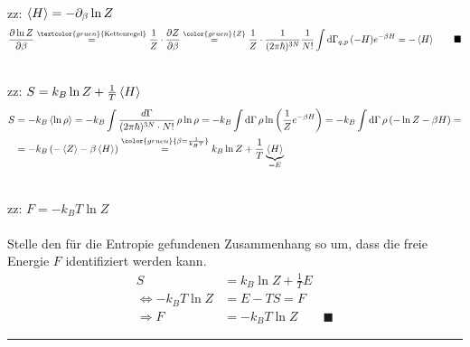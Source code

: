 \documentclass{article}
\newcommand{\diff}{\mathrm{d}}
\newcommand{\lr}[1]{\left(#1\right)}
\newcommand{\commenttext}[1]{\textcolor{gruen}{\text{#1}}}
\newcommand{\comment}[1]{{\color{gruen} {#1}}}
\begin{document}
{	
	\\
	zz: $\braket{H} = -\partial_\beta \ln Z$
		\begin{align*}
			\frac{\partial \ln Z}{\partial\beta} \stackrel{\commenttext{Kettenregel}}{=} \frac{1}{Z} \cdot \frac{\partial Z}{\partial \beta} \stackrel{\comment{Z}}{=} \frac{1}{Z} \cdot \frac{1}{(2\pi\hbar)^{3N}}\frac{1}{N!} \int \diff\Gamma_{q,p}\, (-H) e^{-\beta H} = -\braket{H} \qquad\blacksquare
		\end{align*}

	\\
	zz: $S = k_B \ln Z + \frac{1}{T} \braket{H}$
		\begin{align*}
			S &= -k_B \braket{\ln\rho} = -k_B \int \frac{d\Gamma}{(2\pi\hbar)^{3N}\cdot N!}\, \rho \ln \rho = -k_B \int \diff\Gamma\, \rho \ln\lr{\frac{1}{Z}e^{-\beta H}} = -k_B \int \diff\Gamma\, \rho \lr{ -\ln Z - \beta H } = \\
			&= -k_B \lr{-\braket{Z} - \beta\braket{H}} \stackrel{\comment{\beta = \frac{1	}{k_B T}}}{=} k_B \ln Z + \frac{1}{T} \underbrace{\braket{H}}_{=E}
		\end{align*}

	\\
	zz: $F = -k_B T \ln Z$\\
	\\
	Stelle den für die Entropie gefundenen Zusammenhang so um, dass die freie Energie $F$ identifiziert werden kann.
		\begin{align*}
			S &= k_B \ln Z + \frac{1}{T}E \\
			\Leftrightarrow -k_B T \ln Z &= E - TS = F \\
			\Rightarrow F &= -k_B T \ln Z \qquad \blacksquare
		\end{align*}


\hrule
}


\newpage
\end{document}
